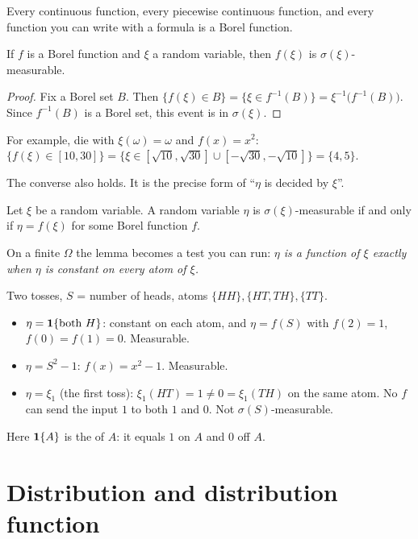 Every continuous function, every piecewise continuous function, and every function you can write with a formula is a Borel function.

\begin{result}
\label{res:f-xi}
If $f$ is a Borel function and $\xi$ a random variable, then $f(\xi)$ is $\sigma(\xi)$-measurable.
\end{result}
\begin{proof}
Fix a Borel set $B$. Then $\{f(\xi)\in B\}=\{\xi\in f^{-1}(B)\}=\xi^{-1}\big(f^{-1}(B)\big)$. Since $f^{-1}(B)$ is a Borel set, this event is in $\sigma(\xi)$.
\end{proof}

For example, die with $\xi(\omega)=\omega$ and $f(x)=x^2$: $\{f(\xi)\in[10,30]\}=\{\xi\in[\sqrt{10},\sqrt{30}]\cup[-\sqrt{30},-\sqrt{10}]\}=\{4,5\}$.

The converse also holds. It is the precise form of ``$\eta$ is decided by $\xi$''.

\begin{theorem}
\label{thm:doob-dynkin}
Let $\xi$ be a random variable. A random variable $\eta$ is $\sigma(\xi)$-measurable if and only if $\eta=f(\xi)$ for some Borel function $f$.
\end{theorem}
\noproof

On a finite $\Omega$ the lemma becomes a test you can run: \emph{$\eta$ is a function of $\xi$ exactly when $\eta$ is constant on every atom of $\xi$.}

\begin{example}
Two tosses, $S$ = number of heads, atoms $\{HH\},\{HT,TH\},\{TT\}$.
\begin{itemize}
  \item $\eta=\mathbf{1}\{\text{both }H\}$: constant on each atom, and $\eta=f(S)$ with $f(2)=1$, $f(0)=f(1)=0$. Measurable.
  \item $\eta=S^2-1$: $f(x)=x^2-1$. Measurable.
  \item $\eta=\xi_1$ (the first toss): $\xi_1(HT)=1\ne0=\xi_1(TH)$ on the same atom. No $f$ can send the input $1$ to both $1$ and $0$. Not $\sigma(S)$-measurable.
\end{itemize}
Here $\mathbf{1}\{A\}$ is the  of $A$: it equals $1$ on $A$ and $0$ off $A$.
\end{example}

\section{Distribution and distribution function}

